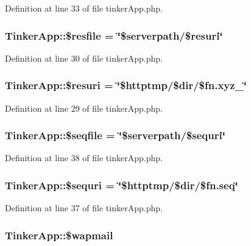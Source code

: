 Definition at line 33 of file tinker\-App.php.
\subsubsection{\setlength{\rightskip}{0pt plus 5cm}Tinker\-App::\$resfile = \char`\"{}\$serverpath/\$resuri\char`\"{}}\label{classTinkerApp_o11}




Definition at line 30 of file tinker\-App.php.
\subsubsection{\setlength{\rightskip}{0pt plus 5cm}Tinker\-App::\$resuri = \char`\"{}\$httptmp/\$dir/\$fn.xyz\_\char`\"{}}\label{classTinkerApp_o10}




Definition at line 29 of file tinker\-App.php.
\subsubsection{\setlength{\rightskip}{0pt plus 5cm}Tinker\-App::\$seqfile = \char`\"{}\$serverpath/\$sequri\char`\"{}}\label{classTinkerApp_o15}




Definition at line 38 of file tinker\-App.php.
\subsubsection{\setlength{\rightskip}{0pt plus 5cm}Tinker\-App::\$sequri = \char`\"{}\$httptmp/\$dir/\$fn.seq\char`\"{}}\label{classTinkerApp_o14}




Definition at line 37 of file tinker\-App.php.
\subsubsection{\setlength{\rightskip}{0pt plus 5cm}Tinker\-App::\$wapmail}\label{classTinkerApp_o22}




